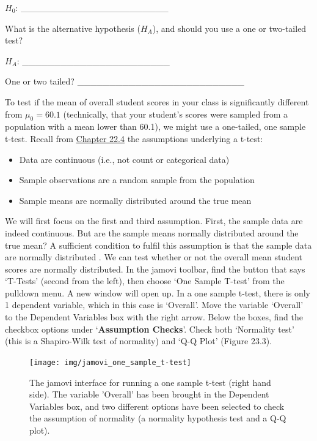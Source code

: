 \documentclass[
]{scrbook}
\providecommand{\tightlist}{%
  \setlength{\itemsep}{0pt}\setlength{\parskip}{0pt}}
\begin{document}
\(H_{0}\): \_\_\_\_\_\_\_\_\_\_\_\_\_\_\_\_\_\_\_\_\_\_\_

What is the alternative hypothesis (\(H_{A}\)), and should you use a one or two-tailed test?

\(H_{A}\): \_\_\_\_\_\_\_\_\_\_\_\_\_\_\_\_\_\_\_\_\_\_\_

One or two tailed? \_\_\_\_\_\_\_\_\_\_\_\_\_\_\_\_\_\_\_\_\_\_\_\_\_\_

To test if the mean of overall student scores in your class is significantly different from \(\mu_{0} = 60.1\) (technically, that your student's scores were sampled from a population with a mean lower than 60.1), we might use a one-tailed, one sample t-test.
Recall from \protect\hyperlink{assumptions-of-t-tests}{Chapter 22.4} the assumptions underlying a t-test:

\begin{itemize}
\tightlist
\item
  Data are continuous (i.e., not count or categorical data)
\item
  Sample observations are a random sample from the population
\item
  Sample means are normally distributed around the true mean
\end{itemize}

We will first focus on the first and third assumption.
First, the sample data are indeed continuous.
But are the sample means normally distributed around the true mean?
A sufficient condition to fulfil this assumption is that the sample data are normally distributed \citep{Johnson1995, Lumley2002}.
We can test whether or not the overall mean student scores are normally distributed.
In the jamovi toolbar, find the button that says `T-Tests' (second from the left), then choose `One Sample T-test' from the pulldown menu.
A new window will open up.
In a one sample t-test, there is only 1 dependent variable, which in this case is `Overall'.
Move the variable `Overall' to the Dependent Variables box with the right arrow.
Below the boxes, find the checkbox options under `\textbf{Assumption Checks}'.
Check both `Normality test' (this is a Shapiro-Wilk test of normality) and `Q-Q Plot' (Figure 23.3).

\begin{figure}
\texttt{[image: img/jamovi\_one\_sample\_t-test]} \caption{The jamovi interface for running a one sample t-test (right hand side). The variable 'Overall' has been brought in the Dependent Variables box, and two different options have been selected to check the assumption of normality (a normality hypothesis test and a Q-Q plot).}\label{fig:unnamed-chunk-102}
\end{figure}
\end{document}
